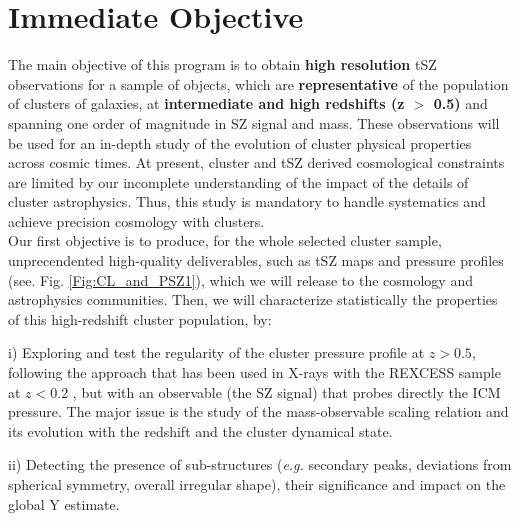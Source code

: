 \documentclass[11pt,a4paper,twoside,graphicx,color]{article}
\newcommand{\laurence}[1]{#1}
\begin{document}
\section{Immediate Objective}
The main objective of this program is to obtain {\bf high resolution}
tSZ observations for a sample of objects, which are
{\bf representative} of the population of clusters of galaxies, at
{\bf intermediate and high redshifts (z $>$ 0.5)} and spanning one 
order of magnitude in SZ signal and mass. These observations
will be used for an in-depth study of the evolution of cluster
physical properties across cosmic times. At present, cluster and tSZ
derived cosmological constraints are limited by our incomplete
understanding of the impact of the details of cluster astrophysics.
Thus, this study is mandatory to handle systematics and achieve 
precision cosmology with clusters.\\ 
%
\laurence{Our first objective is to produce, for the whole selected cluster sample, unprecendented
  high-quality deliverables, such as tSZ maps and pressure profiles (see. Fig. \ref{Fig:CL_and_PSZ1}),  
   which we will release to the cosmology and astrophysics communities.} Then, we will characterize statistically the 
   properties of this high-redshift cluster population, by:

i) Exploring and test the regularity of the cluster pressure profile
at $z>0.5$, following the approach that has been used in X-rays with
the REXCESS sample at $z<0.2$ \cite{Arnaud2010}, but with an
observable (the SZ signal) that probes directly the ICM pressure.
The major issue is the study of the mass-observable
scaling relation and its evolution with the redshift and the cluster
dynamical state.

ii) Detecting the presence of sub-structures ({\it e.g.} secondary peaks,
deviations from spherical symmetry, overall irregular shape), their
significance and impact on the global Y estimate.
\end{document}
